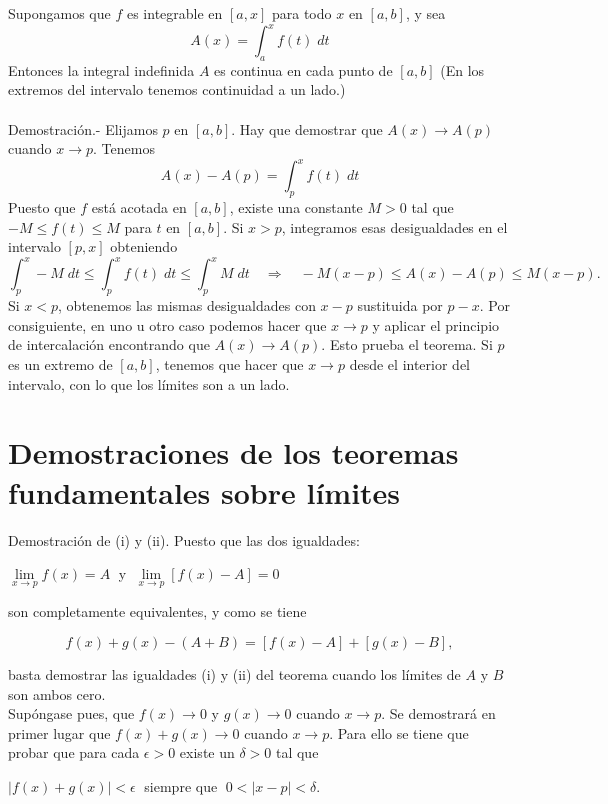 \begin{teo}
    Supongamos que $f$ es integrable en $[a,x]$ para todo $x$ en $[a,b]$, y sea
    $$A(x)=\int_a^x f(t)\; dt$$
    Entonces la integral indefinida $A$ es continua en cada punto de $[a,b]$ (En los extremos del intervalo tenemos continuidad a un lado.)\\\\
	Demostración.-\; Elijamos $p$ en $[a,b]$. Hay que demostrar que $A(x)\to A(p)$ cuando $x\to p.$ Tenemos
	$$A(x)-A(p)=\int_p^x f(t)\; dt$$
	Puesto que $f$ está acotada en $[a,b]$, existe una constante $M>0$ tal que $-M\leq f(t)\leq M$ para $t$ en $[a,b]$. Si $x>p$, integramos esas desigualdades en el intervalo $[p,x]$ obteniendo
	$$\int_p^x -M \;dt \leq \int_p^x f(t)\; dt\leq \int_p^x M \; dt \quad \Longrightarrow \quad -M(x-p)\leq A(x)-A(p)\leq M(x-p).$$
	Si $x<p$, obtenemos las mismas desigualdades con $x-p$ sustituida por $p-x$. Por consiguiente, en uno u otro caso podemos hacer que $x\to p$ y aplicar el principio de intercalación encontrando que $A(x)\to A(p)$. Esto prueba el teorema. Si $p$ es un extremo de $[a,b]$, tenemos que hacer que $x\to p$ desde el interior del intervalo, con lo que los límites son a un lado.
\end{teo}


\section{Demostraciones de los teoremas fundamentales sobre límites}

Demostración de (i) y (ii). Puesto que las dos igualdades:

\begin{center}
    $\lim\limits_{x\to p}f(x)=A\;$ y $\;\lim\limits_{x\to p}[f(x)-A]=0$
\end{center}

son completamente equivalentes, y como se tiene

$$f(x)+g(x)-(A+B) = [f(x)-A]+[g(x)-B],$$

basta demostrar las igualdades (i) y (ii) del teorema cuando los límites de $A$ y $B$ son ambos cero.\\
Supóngase pues, que $f(x)\to 0$ y $g(x)\to 0$ cuando $x\to p$. Se demostrará en primer lugar que $f(x)+g(x)\to 0$ cuando $x\to p$. Para ello se tiene que probar que para cada $\epsilon > 0$ existe un $\delta>0$ tal que 

\begin{center}
    $|f(x)+g(x)|<\epsilon\; $ siempre que $\;0<|x-p|<\delta.$
\end{center}

